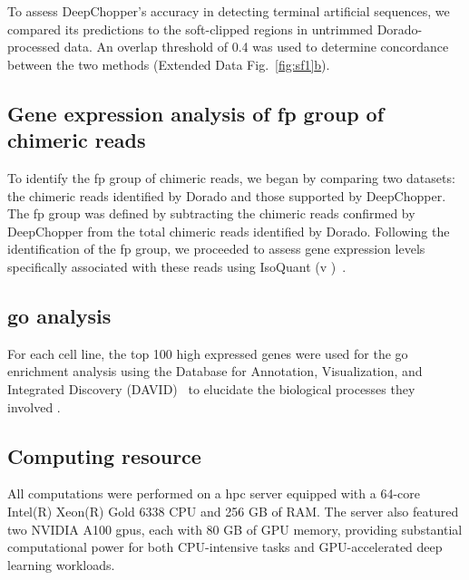 \documentclass[pdflatex, sn-mathphys-num, lineno]{sn-jnl}%
\newcommand{\edfigref}[2]{Extended Data Fig.~\hyperref[#1]{\ref*{#1}#2}}
\theoremstyle{thmstyleone}%
\theoremstyle{thmstyletwo}%
\theoremstyle{thmstylethree}%
\begin{document}
To assess DeepChopper's accuracy in detecting terminal artificial sequences, we compared its predictions to the soft-clipped regions in untrimmed Dorado-processed data.
An overlap threshold of 0.4 was used to determine concordance between the two methods (\edfigref{fig:sf1}{b}).


\subsection{Gene expression analysis of \gls{fp} group of chimeric reads}

To identify the \gls{fp} group of chimeric reads, we began by comparing two datasets: the chimeric reads identified by Dorado and those supported by DeepChopper.
The \gls{fp} group was defined by subtracting the chimeric reads confirmed by DeepChopper from the total chimeric reads identified by Dorado.
Following the identification of the \gls{fp} group, we proceeded to assess gene expression levels specifically associated with these reads using IsoQuant (v )~\cite{prjibelski2023accurate}.


\subsection{\gls{go} analysis}

For each cell line, the top 100 high expressed genes were used for the \gls{go} enrichment analysis using the Database for Annotation, Visualization, and Integrated Discovery (DAVID)~\cite{sherman2022david} to elucidate the biological processes they involved .

\subsection{Computing resource}

All computations were performed on a \gls{hpc} server equipped with a 64-core Intel(R) Xeon(R) Gold 6338 CPU and 256 GB of RAM.
The server also featured two NVIDIA A100 \glspl{gpu}, each with 80 GB of GPU memory, providing substantial computational power for both CPU-intensive tasks and GPU-accelerated deep learning workloads.



\end{document}
